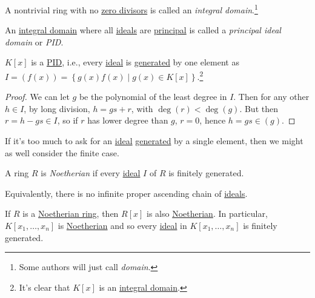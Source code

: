 \begin{definition}\label{def:integral-domain}
	A nontrivial ring with no \hyperref[prev:zero-divisor]{zero divisors} is called an \emph{integral domain}.\footnote{Some authors will just call \emph{domain}.}
\end{definition}

\begin{definition}\label{def:PID}
	An \hyperref[def:integral-domain]{integral domain} where all \hyperref[def:ideal]{ideals} are \hyperref[def:principal-ideal]{principal} is called a \emph{principal ideal domain} or \emph{PID}.
\end{definition}

\begin{theorem}
	\(K[x]\) is a \hyperref[def:PID]{PID}, i.e., every \hyperref[def:ideal]{ideal} is \hyperref[def:ideal-generation]{generated} by one element as \(I=(f(x)) = \left\{ g(x) f(x) \mid g(x) \in K[x] \right\} \).\footnote{It's clear that \(K[x]\) is an \hyperref[def:integral-domain]{integral domain}.}
\end{theorem}
\begin{proof}
	We can let \(g\) be the polynomial of the least degree in \(I\). Then for any other \(h\in I\), by long division, \(h = gs + r\), with \(\deg (r) < \deg(g)\). But then \(r = h - gs \in I\), so if \(r\) has lower degree than \(g\), \(r = 0\), hence \(h = gs\in (g)\).
\end{proof}

If it's too much to ask for an \hyperref[def:ideal]{ideal} \hyperref[def:ideal-generation]{generated} by a single element, then we might as well consider the finite case.

\begin{definition}\label{def:Noetherian-ring}
	A ring \(R\) is \emph{Noetherian} if every \hyperref[def:ideal]{ideal} \(I\) of \(R\) is finitely generated.
\end{definition}

\begin{remark}
	Equivalently, there is no infinite proper ascending chain of \hyperref[def:ideal]{ideals}.
\end{remark}

\begin{theorem}\label{thm:Hilbert-basis}
	If \(R\) is a \hyperref[def:Noetherian-ring]{Noetherian ring}, then \(R[x]\) is also \hyperref[def:Noetherian-ring]{Noetherian}. In particular, \(K[x_1, \ldots , x_n]\) is \hyperref[def:Noetherian-ring]{Noetherian} and so every \hyperref[def:ideal]{ideal} in \(K[x_1, \ldots , x_n]\) is finitely generated.
\end{theorem}

